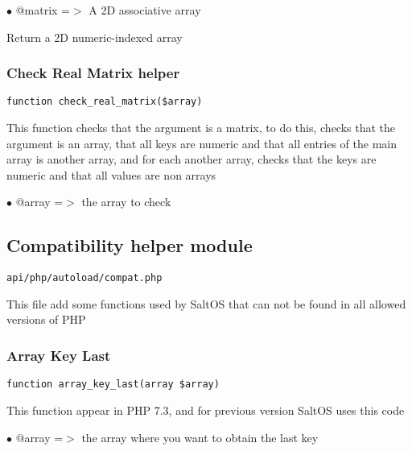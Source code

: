 \documentclass[a4paper]{article}
\begin{document}
\begin{compactitem}
\item[\color{myblue}$\bullet$] @matrix =$>$ A 2D associative array
\end{compactitem}

Return a 2D numeric-indexed array

\hypertarget{toc74}{}
\subsubsection{Check Real Matrix helper}

\begin{lstlisting}
function check_real_matrix($array)
\end{lstlisting}

This function checks that the argument is a matrix, to do this, checks
that the argument is an array, that all keys are numeric and that all
entries of the main array is another array, and for each another array,
checks that the keys are numeric and that all values are non arrays

\begin{compactitem}
\item[\color{myblue}$\bullet$] @array =$>$ the array to check
\end{compactitem}

\hypertarget{toc75}{}
\subsection{Compatibility helper module}

\begin{lstlisting}
api/php/autoload/compat.php
\end{lstlisting}

This file add some functions used by SaltOS that can not be found in all allowed versions of PHP

\hypertarget{toc76}{}
\subsubsection{Array Key Last}

\begin{lstlisting}
function array_key_last(array $array)
\end{lstlisting}

This function appear in PHP 7.3, and for previous version SaltOS
uses this code

\begin{compactitem}
\item[\color{myblue}$\bullet$] @array =$>$ the array where you want to obtain the last key
\end{compactitem}
\end{document}
